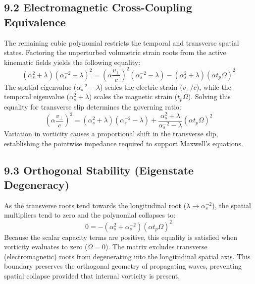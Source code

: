 \subsection*{9.2 Electromagnetic Cross-Coupling Equivalence} 
The remaining cubic polynomial restricts the temporal and transverse spatial states. Factoring the unperturbed volumetric strain roots from the active kinematic fields yields the following equality: 
\begin{equation} 
    (\alpha_s^2 + \lambda) (\alpha_s^{-2} - \lambda)^2 = \left(\alpha \frac{v_\perp}{c}\right)^2 (\alpha_s^{-2} - \lambda) - (\alpha_s^2 + \lambda)(\alpha t_p \Omega)^2 
\end{equation} 
The spatial eigenvalue ($\alpha_s^{-2} - \lambda$) scales the electric strain ($v_\perp / c$), while the temporal eigenvalue ($\alpha_s^2 + \lambda$) scales the magnetic strain ($t_p \Omega$). Solving this equality for transverse slip determines the governing ratio: 
\begin{equation}
    \left(\alpha \frac{v_\perp}{c}\right)^2 = (\alpha_s^2 + \lambda)(\alpha_s^{-2} - \lambda) + \frac{\alpha_s^2 + \lambda}{\alpha_s^{-2} - \lambda} (\alpha t_p \Omega)^2 
\end{equation} 
Variation in vorticity causes a proportional shift in the transverse slip, establishing the pointwise impedance required to support Maxwell's equations. 

\subsection*{9.3 Orthogonal Stability (Eigenstate Degeneracy)} %
As the transverse roots tend towards the longitudinal root ($\lambda \to \alpha_s^{-2}$), the spatial multipliers tend to zero and the polynomial collapses to: 
\begin{equation} 
    0 = - (\alpha_s^2 + \alpha_s^{-2})(\alpha t_p \Omega)^2 
\end{equation}
Because the scalar capacity terms are positive, this equality is satisfied when vorticity evaluates to zero ($\Omega = 0$). The matrix excludes transverse (electromagnetic) roots from degenerating into the longitudinal spatial axis. This boundary preserves the orthogonal geometry of propagating waves, preventing spatial collapse provided that internal vorticity is present. 

